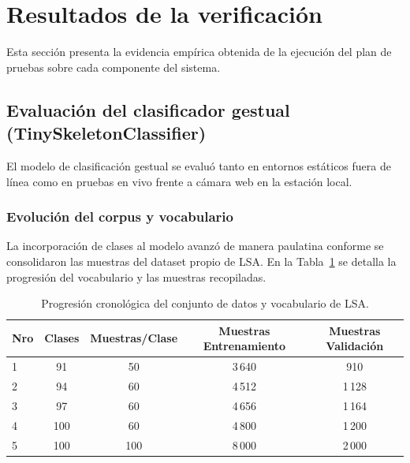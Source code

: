 \section{Resultados de la verificación}
\label{sec:resultados_verificacion}

Esta sección presenta la evidencia empírica obtenida de la ejecución del plan de pruebas sobre cada componente del sistema.

\subsection{Evaluación del clasificador gestual (TinySkeletonClassifier)}
\label{sec:res_clasificador}

El modelo de clasificación gestual se evaluó tanto en entornos estáticos fuera de línea como en pruebas en vivo frente a cámara web en la estación local.

\subsubsection{Evolución del corpus y vocabulario}
La incorporación de clases al modelo avanzó de manera paulatina conforme se consolidaron las muestras del dataset propio de LSA. En la Tabla~\ref{tab:evolucion_corpus} se detalla la progresión del vocabulario y las muestras recopiladas.

\begin{table}[H]
    \centering
    \small
    \caption{Progresión cronológica del conjunto de datos y vocabulario de LSA.}
    \label{tab:evolucion_corpus}
    \begin{tabular}{lcccc}
        \toprule
        \textbf{Nro} & \textbf{Clases} & \textbf{Muestras/Clase} & \textbf{Muestras Entrenamiento} & \textbf{Muestras Validación} \\
        \midrule
        1 & 91 & 50 & 3\,640 & 910 \\
        2 & 94 & 60 & 4\,512 & 1\,128 \\
        3 & 97 & 60 & 4\,656 & 1\,164 \\
        4 & 100 & 60 & 4\,800 & 1\,200 \\
        5 & 100 & 100 & 8\,000 & 2\,000 \\
        \bottomrule
    \end{tabular}
\end{table}

